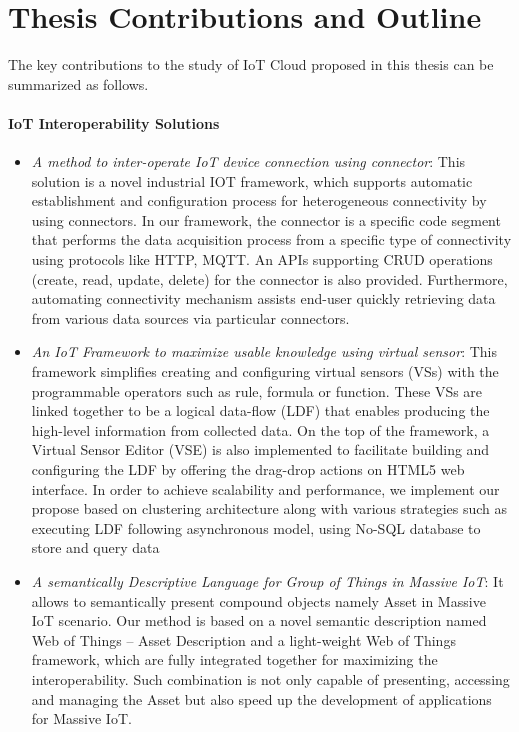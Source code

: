  

\section{Thesis Contributions and Outline}
The key contributions to the study of IoT Cloud proposed in this thesis can be summarized as follows.
\paragraph{IoT Interoperability Solutions}
\begin{itemize}
\item \textit{A method to inter-operate IoT device connection using connector}: This solution is a novel industrial IOT framework, which supports automatic establishment and configuration process for heterogeneous connectivity by using connectors. In our framework, the connector is a specific code segment that performs the data acquisition process from a specific type of connectivity using protocols like HTTP, MQTT. An APIs supporting CRUD operations (create, read, update, delete) for the connector is also provided. Furthermore, automating connectivity mechanism assists end-user quickly retrieving data from various data sources via particular connectors.

\item \textit{An IoT Framework to maximize usable knowledge using virtual sensor}: This framework simplifies creating and configuring virtual sensors (VSs) with the programmable operators such as rule, formula or function. These VSs are linked together to be a logical data-flow (LDF) that enables producing the high-level information from collected data. On the top of the framework, a Virtual Sensor Editor (VSE) is also implemented to facilitate building and configuring the LDF by offering the drag-drop actions on HTML5 web interface. In order to achieve scalability and performance, we implement our propose based on clustering architecture along with various strategies such as executing LDF following asynchronous model, using No-SQL database to store and query data

\item \textit{A semantically Descriptive Language for Group of Things in Massive IoT}: It allows to semantically present compound objects namely Asset in Massive IoT scenario. Our method is based on a novel semantic description named Web of Things – Asset Description and a light-weight Web of Things framework, which are fully integrated together for maximizing the interoperability. Such combination is not only capable of presenting, accessing and managing the Asset but also speed up the development of applications for Massive IoT.

\end{itemize}

